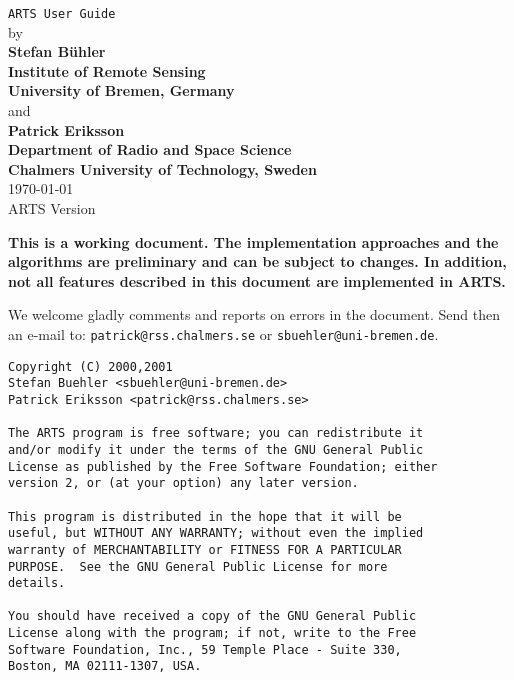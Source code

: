   



%



%
%
\thispagestyle{plain}
\begin{center}
  \vspace*{2cm}
  {\Huge \verb|ARTS User Guide|\\}
  \vspace*{1cm}
  {\large by \\}
  \vspace*{1cm}
  {\large \bf Stefan B\"uhler\\Institute of Remote Sensing\\University of Bremen, Germany\\}
  \vspace*{3mm}
  {\large and\\}
  \vspace*{3mm}
  {\large \bf Patrick Eriksson\\Department of Radio and Space Science\\Chalmers University of Technology, Sweden\\}
   \vspace*{2cm}
   {\large \today\\
    ARTS Version 
   }
\end{center}
  \vspace*{4cm}
{\normalsize \bf
  \noindent
  This is a working document. The implementation approaches and the
  algorithms are preliminary and can be subject to changes. In addition,
  not all features described in this document are implemented in ARTS.
  
  We welcome gladly comments and reports on errors in the document.
  Send then an e-mail to: \verb|patrick@rss.chalmers.se| or 
  \verb|sbuehler@uni-bremen.de|.
}

\newpage                          
\thispagestyle{empty}
\vspace*{\fill}
\noindent
\begin{verbatim}
Copyright (C) 2000,2001 
Stefan Buehler <sbuehler@uni-bremen.de>
Patrick Eriksson <patrick@rss.chalmers.se>

The ARTS program is free software; you can redistribute it
and/or modify it under the terms of the GNU General Public
License as published by the Free Software Foundation; either
version 2, or (at your option) any later version.

This program is distributed in the hope that it will be
useful, but WITHOUT ANY WARRANTY; without even the implied
warranty of MERCHANTABILITY or FITNESS FOR A PARTICULAR
PURPOSE.  See the GNU General Public License for more
details. 

You should have received a copy of the GNU General Public
License along with the program; if not, write to the Free
Software Foundation, Inc., 59 Temple Place - Suite 330,
Boston, MA 02111-1307, USA. 
\end{verbatim}
\cleardoublepage

